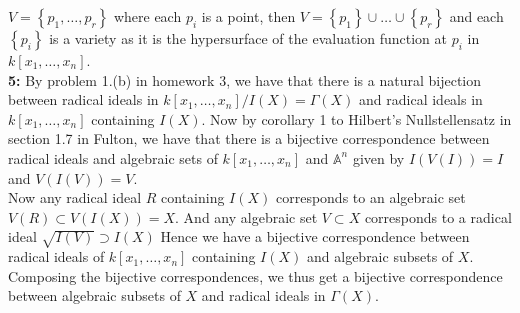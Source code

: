 \documentclass[a4paper]{article}
\begin{document}
    $V = \left\{ p_1, \ldots, p_r \right\} $ where each $p_i$ is a point, then
    $V = \left\{ p_1 \right\} \cup \ldots \cup \left\{ p_r \right\} $ and each
    $\left\{ p_i \right\} $ is a variety as it is the hypersurface of
    the evaluation function at $p_i$ in $k\left[ x_1, \ldots, x_n \right] $.\\
    \linebreak
    \textbf{5:} By problem 1.(b) in homework 3, we have that there
    is a natural bijection between radical ideals in 
    $k\left[ x_1, \ldots, x_n \right] / I(X) = \Gamma(X)$ and
    radical ideals in $k\left[ x_1, \ldots, x_n \right] $ containing
    $I(X)$. Now by corollary 1 to Hilbert's Nullstellensatz in section 1.7 in
    Fulton, we have that there is a bijective correspondence between radical
    ideals and algebraic sets of $k\left[ x_1 ,\ldots, x_n \right] $ and
    $\mathbb{A}^{n}$ given by $I(V(I)) = I$ and $V(I(V)) = V$.\\
    Now any radical ideal $R$ containing $I(X)$ corresponds to
    an algebraic set $V(R) \subset V(I(X)) = X$. And any algebraic set
    $V \subset X$ corresponds to a radical ideal $\sqrt{ I(V)} \supset I(X)$ 
    Hence
    we have a bijective correspondence between radical ideals of $k\left[ x_1
    ,\ldots, x_n \right] $ containing $I(X)$ and algebraic subsets of $X$.\\
    Composing the bijective correspondences, we thus get a bijective
    correspondence between algebraic subsets of $X$ and radical ideals in
    $\Gamma(X)$.
    
 
\end{document}
